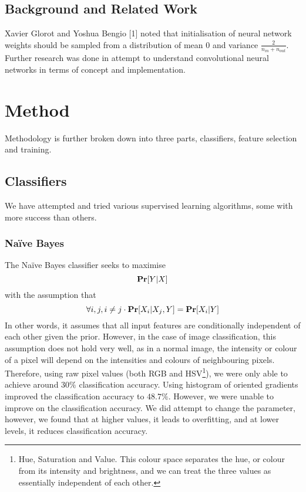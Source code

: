 \documentclass{article} %
\begin{document}
\subsection{Background and Related Work}

Xavier Glorot and Yoshua Bengio [1] noted that initialisation of neural network weights should be sampled from a distribution of mean 0 and variance $\frac{2}{n_{in}+n_{out}}$.
Further research was done in attempt to understand convolutional neural networks in terms of concept and implementation.



\section{Method}
Methodology is further broken down into three parts, classifiers, feature selection and training.

\subsection{Classifiers}
We have attempted and tried various supervised learning algorithms, some with more success than others.

\subsubsection{Na\"ive Bayes}
The Na\"ive Bayes classifier seeks to maximise
$$\mathbf{Pr}[{Y|X}]$$
with the assumption that
$$\forall i,j,  i\neq j \cdot \mathbf{Pr}[{X_i|X_j, Y}]=\mathbf{Pr}[{X_i|Y}]$$
In other words, it assumes that all input features are conditionally independent of each other given the prior. However, in the case of image classification, this assumption does
not hold very well, as in a normal image, the intensity or colour of a pixel will depend on the intensities and colours of neighbouring pixels. Therefore, using raw pixel values (both RGB and HSV\footnote{Hue, Saturation and Value. This colour space separates the hue, or colour from its intensity and brightness, and we can treat the three values as essentially independent of each other.}), we were only able to achieve around $30\%$ classification accuracy. Using histogram of oriented gradients improved the classification accuracy to $48.7\%$. However, we
were unable to improve on the classification accuracy. We did attempt to change the  parameter, however, we found that at higher values, it leads to overfitting, and
at lower levels, it reduces classification accuracy.
\end{document}
